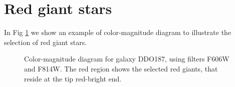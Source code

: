 \documentclass[useAMS,usenatbib,twocolumn]{mn2e}
\begin{document}
\section{Red giant stars}
\label{ap:color-mag}
In Fig \ref{fig:selectrg} we show an example of color-magnitude diagram to
illustrate the selection of red giant stars. 
\begin{figure}
  \caption{Color-magnitude diagram for galaxy DDO187, using filters F606W
and F814W. The red region shows the selected red giants, that reside at the tip
red-bright end. \label{fig:selectrg}}
\end{figure}
\end{document}
